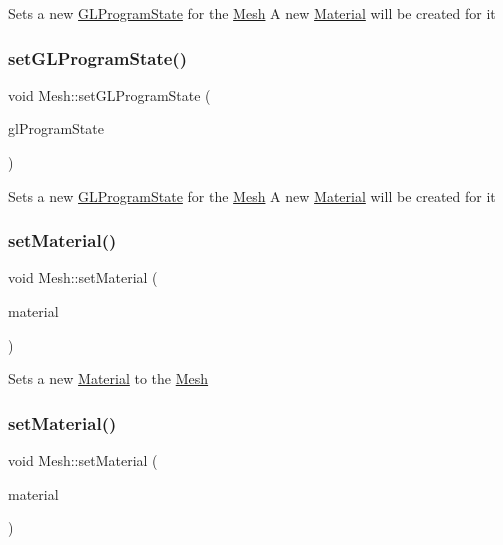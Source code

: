 Sets a new \hyperlink{classGLProgramState}{G\+L\+Program\+State} for the \hyperlink{classMesh}{Mesh} A new \hyperlink{classMaterial}{Material} will be created for it \mbox{\label{classMesh_a0ed181ab96758bfef2c6836aad2d8f8c}} 
\subsubsection{\texorpdfstring{set\+G\+L\+Program\+State()}{setGLProgramState()}\hspace{0.1cm}{\footnotesize\ttfamily [2/2]}}
{\footnotesize\ttfamily void Mesh\+::set\+G\+L\+Program\+State (\begin{DoxyParamCaption}\item[{\hyperlink{classGLProgramState}{G\+L\+Program\+State} $\ast$}]{gl\+Program\+State }\end{DoxyParamCaption})}

Sets a new \hyperlink{classGLProgramState}{G\+L\+Program\+State} for the \hyperlink{classMesh}{Mesh} A new \hyperlink{classMaterial}{Material} will be created for it \mbox{\label{classMesh_acee71afee77988e9233bee788ac501f3}} 
\subsubsection{\texorpdfstring{set\+Material()}{setMaterial()}\hspace{0.1cm}{\footnotesize\ttfamily [1/2]}}
{\footnotesize\ttfamily void Mesh\+::set\+Material (\begin{DoxyParamCaption}\item[{\hyperlink{classMaterial}{Material} $\ast$}]{material }\end{DoxyParamCaption})}

Sets a new \hyperlink{classMaterial}{Material} to the \hyperlink{classMesh}{Mesh} \mbox{\label{classMesh_acee71afee77988e9233bee788ac501f3}} 
\subsubsection{\texorpdfstring{set\+Material()}{setMaterial()}\hspace{0.1cm}{\footnotesize\ttfamily [2/2]}}
{\footnotesize\ttfamily void Mesh\+::set\+Material (\begin{DoxyParamCaption}\item[{\hyperlink{classMaterial}{Material} $\ast$}]{material }\end{DoxyParamCaption})}

